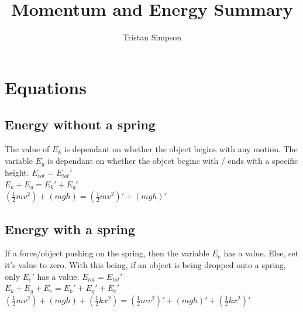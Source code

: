 \documentclass{article}
\title{Momentum and Energy Summary}
\author{Tristan Simpson}
\begin{document}
\maketitle

\section{Equations}
\begin{adjustwidth}{1cm}{0pt}
    \subsection{Energy without a spring}
    \begin{flushleft}
        The value of $E_{k}$ is dependant on whether the object begins with any motion. The variable $E_{g}$ is dependant on whether the object begins with / ends with a specific height.\newline\newline
        $E_{tot} = E_{tot}\prime$ \\
        \vspace*{10pt}
        $E_{k} + E_{g} = E_{k}\prime + E_{g}\prime$ \\
        \vspace*{10pt}
        $(\frac{1}{2}mv^2) + (mgh) = (\frac{1}{2}mv^2)\prime + (mgh)\prime$
    \end{flushleft}
    \subsection{Energy with a spring}
    \begin{flushleft}
        If a force/object pushing on the spring, then the variable $E_{e}$ has a value. Else, set it's value to zero. With this being, if an object is being dropped onto a spring, only $E_{e}\prime$ has a value.\newline\newline
        $E_{tot} = E_{tot}\prime$ \\
        \vspace*{10pt}
        $E_{k} + E_{g} + E_{e} = E_{k}\prime + E_{g}\prime + E_{e}\prime$ \\
        \vspace*{10pt}
        $(\frac{1}{2}mv^2) + (mgh) + (\frac{1}{2}kx^2) = (\frac{1}{2}mv^2)\prime + (mgh)\prime + (\frac{1}{2}kx^2)\prime$
    \end{flushleft}

\end{adjustwidth}
\end{document}
